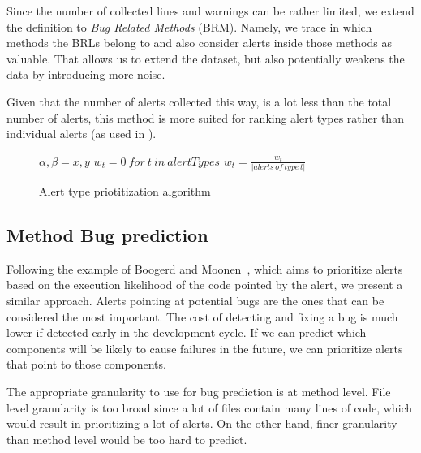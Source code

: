 
Since the number of collected lines and warnings can be rather limited, we extend the definition to \textit{Bug Related Methods} (BRM). Namely, we trace in which methods the BRLs belong to and also consider alerts inside those methods as valuable. That allows us to extend the dataset, but also potentially weakens the data by introducing more noise.

Given that the number of alerts collected this way, is a lot less than the total number of alerts, this method is more suited for ranking alert types rather than individual alerts (as used in \cite{which_warnings}).

\begin{figure}[ht]
	\centering
	\begin{minipage}{.5\linewidth}
		\begin{algorithm}[H]
			\SetAlgoLined
			$\alpha, \beta = x, y$\;
			$w_t = 0 \ for \ t \ in \ alertTypes$\;
			$w_t = \frac{w_t}{|alerts \, of \, type \, t|}$
			\caption{Alert type priotitization algorithm}
		\end{algorithm}
	\end{minipage}
\end{figure}

\subsection{Method Bug prediction}

Following the example of Boogerd and Moonen~\cite{static_profiling}, which aims to prioritize alerts based on the execution likelihood of the code pointed by the alert, we present a similar approach. Alerts pointing at potential bugs are the ones that can be considered the most important. The cost of detecting and fixing a bug is much lower if detected early in the development cycle. If we can predict which components will be likely to cause failures in the future, we can prioritize alerts that point to those components.

The appropriate granularity to use for bug prediction is at method level. File level granularity is too broad since a lot of files contain many lines of code, which would result in prioritizing a lot of alerts. On the other hand, finer granularity than method level would be too hard to predict.

